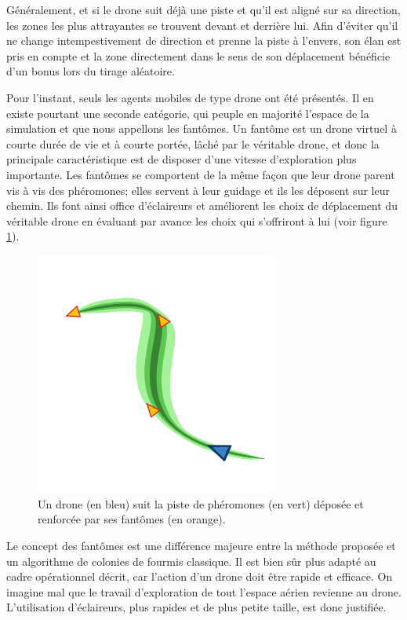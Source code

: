 \documentclass[12pt]{article}
\begin{document}
Généralement, et si le drone suit déjà une piste et qu'il est aligné
sur sa direction, les zones les plus attrayantes se trouvent devant et
derrière lui. Afin d'éviter qu'il ne change intempestivement de
direction et prenne la piste à l'envers, son élan est pris en compte
et la zone directement dans le sens de son déplacement bénéficie d'un
bonus lors du tirage aléatoire.

Pour l'instant, seuls les agents mobiles de type drone ont été
présentés. Il en existe pourtant une seconde catégorie, qui peuple en
majorité l'espace de la simulation et que nous appellons les
fantômes. Un fantôme est un drone virtuel à courte durée de vie et à
courte portée, lâché par le véritable drone, et donc la principale
caractéristique est de disposer d'une vitesse d'exploration plus
importante.  Les fantômes se comportent de la même façon que leur
drone parent vis à vis des phéromones; elles servent à leur guidage et
ils les déposent sur leur chemin. Ils font ainsi office d'éclaireurs
et améliorent les choix de déplacement du véritable drone en évaluant
par avance les choix qui s'offriront à lui (voir figure \ref{ghosts}).

\begin{figure}[H]
  \centering

  \includegraphics[width=8cm]{ghosts.png}

  \caption{Un drone (en bleu) suit la piste de phéromones (en vert)
    déposée et renforcée par ses fantômes (en orange).}
  \label{ghosts}
\end{figure}

Le concept des fantômes est une différence majeure entre la méthode
proposée et un algorithme de colonies de fourmis classique. Il est
bien sûr plus adapté au cadre opérationnel décrit, car l'action d'un
drone doit être rapide et efficace. On imagine mal que le travail
d'exploration de tout l'espace aérien revienne au drone. L'utilisation
d'éclaireurs, plus rapides et de plus petite taille, est donc
justifiée.
\end{document}

